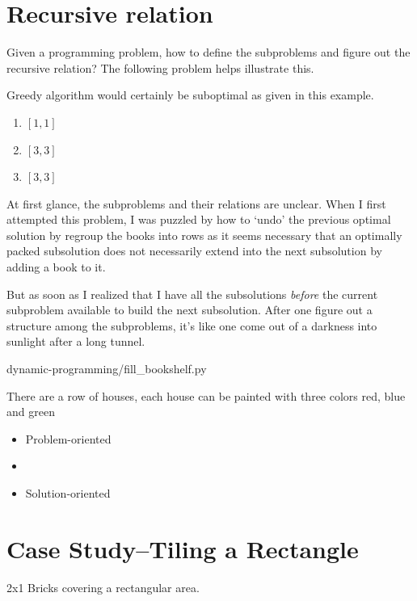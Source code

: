 \section{Recursive relation}\label{sec:recursive-relation}

Given a programming problem, how to define the subproblems and figure out the recursive relation?
The following problem helps illustrate this.

Greedy algorithm would certainly be suboptimal as given in this example.
\begin{enumerate}
    \item $[1, 1]$
    \item $[3, 3]$
    \item $[3, 3]$
\end{enumerate}

At first glance, the subproblems and their relations are unclear.
When I first attempted this problem, I was puzzled by how to `undo' the previous optimal solution
by regroup the books into rows as it seems necessary that an optimally packed subsolution does
not necessarily extend into the next subsolution by adding a book to it.

But as soon as I realized that I have all the subsolutions \emph{before} the current subproblem
available to build the next subsolution.
After one figure out a structure among the subproblems, it's like one come out of a darkness
into sunlight after a long tunnel.
\begin{clisting}
    
    {dynamic-programming/fill_bookshelf.py}
\end{clisting}

There are a row of houses, each house can be painted with three colors red, blue and green
\label{Evernote:Paint House (I and II)}
\begin{itemize}
    \item Problem-oriented\label{Evernote:Split "bothearthandsaturnspin" into words word break wordbreak}
    \item \item Solution-oriented
\end{itemize}

\section{Case Study--Tiling a Rectangle} \label{sec:tiling-rectangle}
\label{Evernote:2x1 brick paving problem tiling}
2x1 Bricks covering a rectangular area.


